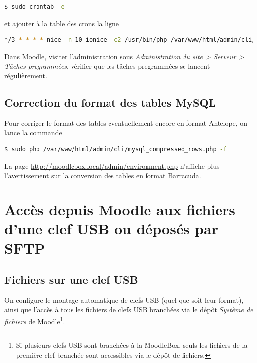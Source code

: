 \documentclass[11pt]{article}
\begin{document}
\begin{lstlisting}[language=bash]
$ sudo crontab -e
\end{lstlisting}

et ajouter à la table des crons la ligne
\begin{lstlisting}[language=bash]
*/3 * * * * nice -n 10 ionice -c2 /usr/bin/php /var/www/html/admin/cli/cron.php
\end{lstlisting}

\begin{verification}
Dans Moodle, visiter l'administration sous \emph{Administration du site > Serveur > Tâches programmées}, vérifier que les tâches programmées se lancent régulièrement.
\end{verification}

\subsection{Correction du format des tables MySQL}

Pour corriger le format des tables éventuellement encore en format Antelope, on lance la commande

\begin{lstlisting}[language=bash]
$ sudo php /var/www/html/admin/cli/mysql_compressed_rows.php -f
\end{lstlisting}

\begin{verification}
La page \url{http://moodlebox.local/admin/environment.php} n'affiche plus l'avertissement sur la conversion des tables en format Barracuda.
\end{verification}

\section{Accès depuis Moodle aux fichiers d'une clef USB ou déposés par SFTP}

\subsection{Fichiers sur une clef USB}

On configure le montage automatique de clefs USB (quel que soit leur format), ainsi que l'accès à tous les fichiers de clefs USB branchées via le dépôt \emph{Système de fichiers} de Moodle\footnote{Si plusieurs clefs USB sont branchées à la MoodleBox, seuls les fichiers de la première clef branchée sont accessibles via le dépôt de fichiers.}.
\end{document}
